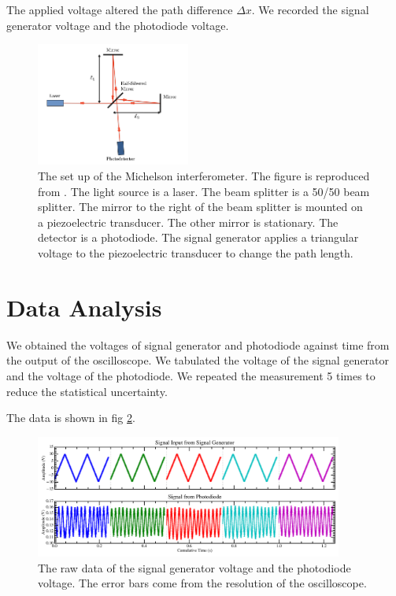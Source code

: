 The applied voltage altered the path difference $\Delta x$. We recorded the signal generator voltage and the photodiode voltage. 
\begin{figure}[h]
    \centering
    \includegraphics[width=0.45\textwidth]{fig/michelson_setup.png}
    \caption{The set up of the Michelson interferometer. The figure is reproduced from \cite{MITOpticalInterferometry2023}. The light source is a laser. The beam splitter is a 50/50 beam splitter. The mirror to the right of the beam splitter is mounted on a piezoelectric transducer. The other mirror is stationary. The detector is a photodiode. The signal generator applies a triangular voltage to the piezoelectric transducer to change the path length.}
    \label{fig:set_up}
\end{figure}

\section{Data Analysis}
We obtained the voltages of signal generator and photodiode against time from the output of the oscilloscope. We tabulated the voltage of the signal generator and the voltage of the photodiode. We repeated the measurement 5 times to reduce the statistical uncertainty.

The data is shown in fig \ref{fig:raw_data}. 
\begin{figure}[h]
    \centering
    \includegraphics[width=0.9\textwidth]{fig/raw_data.png}
    \caption{The raw data of the signal generator voltage and the photodiode voltage. The error bars come from the resolution of the oscilloscope. }
    \label{fig:raw_data}
\end{figure}


